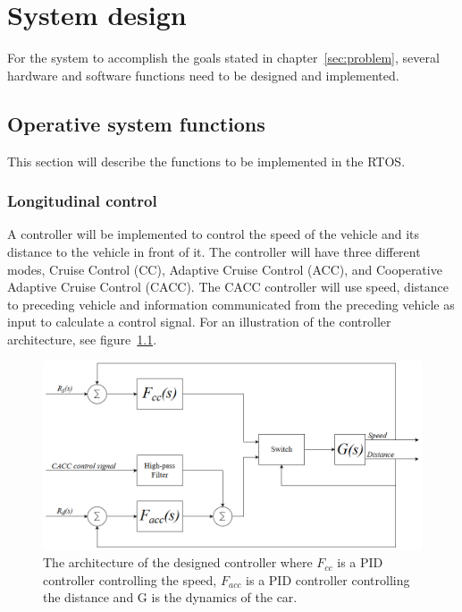 \chapter{System design}
\label{sec:system_design}
For the system to accomplish the goals stated in chapter~\ref{sec:problem}, several hardware and software functions need to be designed and implemented.\\


\section{Operative system functions}
This section will describe the functions to be implemented in the RTOS.

\subsection{Longitudinal control}
A controller will be implemented to control the speed of the vehicle and its distance to the vehicle in front of it. The controller will have three different modes, Cruise Control (CC), Adaptive Cruise Control (ACC), and Cooperative Adaptive Cruise Control (CACC). The CACC controller will use speed, distance to preceding vehicle and information communicated from the preceding vehicle as input to calculate a control signal. For an illustration of the controller architecture, see figure~\ref{fig:cacc}.\\

\begin{figure}[H]
\centering
\includegraphics[width=\textwidth]{./img/design_cacc.png}
\caption{The architecture of the designed controller where $F_{cc}$ is a PID controller controlling the speed, $F_{acc}$ is a PID controller controlling the distance and G is the dynamics of the car.} \label{fig:cacc}
\end{figure}

